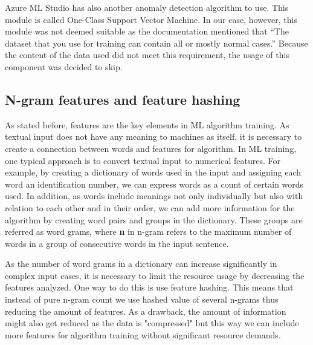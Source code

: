 Azure ML Studio has also another anomaly detection algorithm to use.
This module is called One-Class Support Vector Machine.
In our case, however,
this module was not deemed suitable
as the documentation mentioned that
\enquote{The dataset that you use for training
can contain all or mostly normal cases.}
Because the content of the data used did not meet this requirement,
the usage of this component was decided to skip.



\subsection{N-gram features and feature hashing}\label{subsec:bg-ngram-features}

As stated before, %
features are the key elements in ML algorithm training.
As textual input does not have any meaning to machines as itself,
it is necessary to create a connection between words and features for algorithm.
In ML training, one typical approach is to convert textual input to numerical features.
For example, by creating a dictionary of words used in the input
and assigning each word an identification number,
we can express words as a count of certain words used.
In addition,
as words include meanings not only individually but also
with relation to each other and in their order, %
we can add more information for the algorithm
by creating word pairs and groups in the dictionary.
These groups are referred as word grams,
where \textbf{n} in n-gram refers to the maximum number of words
in a group of consecutive words in the input sentence.



As the number of word grams in a dictionary can increase significantly
in complex input cases,
it is necessary to limit the resource usage by decreasing the features analyzed.
One way to do this is use feature hashing.
This means that instead of pure n-gram count
we use hashed value of several n-grams
thus reducing the amount of features.
As a drawback,
the amount of information might also get reduced as the data is "compressed"
but this way we can include more features for algorithm training
without significant resource demands.

